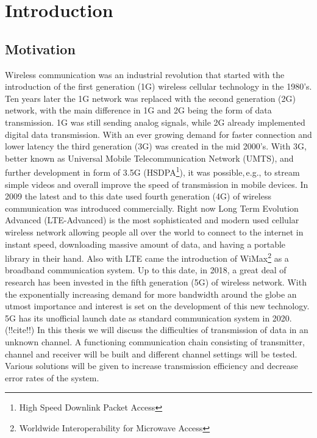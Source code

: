 \chapter{Introduction} \label{chap:intro}
\graphicspath{{C:/Users/Kevin/Bachelarbeit/Bachelorarbeit/01_Bachelorarbeit_LaTex/02_Figures/}}


\section{Motivation}

Wireless communication was an industrial revolution that started with the introduction of the first generation (1G) wireless cellular technology in the 1980's. Ten years later the 1G network was replaced with the second generation (2G) network, with the main difference in 1G and 2G being the form of data transmission. 1G was still sending analog signals, while 2G already implemented digital data transmission.
\newline
With an ever growing demand for faster connection and lower latency the third generation (3G) was created in the mid 2000's. With 3G, better known as Universal Mobile Telecommunication Network (UMTS), and further development in form of 3.5G (HSDPA\footnote{High Speed Downlink Packet Access}), it was possible,\,e.g., to stream simple videos and overall improve the speed of transmission in mobile devices. In 2009 the latest and to this date used fourth generation (4G) of wireless communication was introduced commercially. Right now Long Term Evolution Advanced (LTE-Advanced) is the most sophisticated and modern used cellular wireless network allowing people all over the world to connect to the internet in instant speed, downloading massive amount of data, and having a portable library in their hand. Also with LTE came the introduction of WiMax\footnote{Worldwide Interoperability for Microwave Access} as a broadband communication system.
\newline
Up to this date, in 2018, a great deal of research has been invested in the fifth generation (5G) of wireless network. With the exponentially increasing demand for more bandwidth around the globe an utmost importance and interest is set on the development of this new technology. 
5G has its unofficial launch date as standard communication system in 2020.  (!!cite!!)
\newline
In this thesis we will discuss the difficulties of transmission of data in an unknown channel. A functioning communication chain consisting of transmitter, channel and receiver will be built and different channel settings will be tested. Various solutions will be given to increase transmission efficiency and decrease error rates of the system. 

